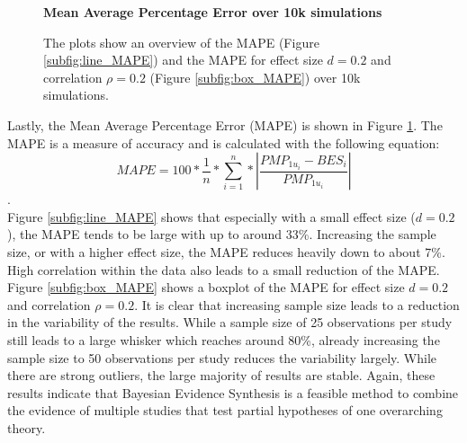 \documentclass[12pt]{article}
\begin{document}
\begin{figure}[htbp]
    \centering
    \textbf{Mean Average Percentage Error over 10k simulations} 
    \vspace{0.5em}
    \hfill
    \caption{The plots show an overview of the MAPE (Figure \ref{subfig:line_MAPE}) and the MAPE for effect size $d = 0.2$ and correlation $\rho = 0.2$ (Figure \ref{subfig:box_MAPE}) over 10k simulations.}
    \label{fig:MAPE}
\end{figure}
Lastly, the Mean Average Percentage Error (MAPE) is shown in Figure \ref{fig:MAPE}. The MAPE is a measure of accuracy and is calculated with the following equation:
\begin{equation}
    MAPE = 100*\frac{1}{n}*\sum_{i=1}^{n}*\left| \frac{PMP_{1u_i} - BES_i}{PMP_{1u_i}} \right|
\end{equation}
\citep{kim_new_2016}. \\
Figure \ref{subfig:line_MAPE} shows that especially with a small effect size ($d = 0.2$), the MAPE tends to be large with up to around 33\%. Increasing the sample size, or with a higher effect size, the MAPE reduces heavily down to about 7\%. High correlation within the data also leads to a small reduction of the MAPE. Figure \ref{subfig:box_MAPE} shows a boxplot of the MAPE for effect size $d = 0.2$ and correlation $\rho = 0.2$. It is clear that increasing sample size leads to a reduction in the variability of the results. While a sample size of 25 observations per study still leads to a large whisker which reaches around 80\%, already increasing the sample size to 50 observations per study reduces the variability largely. While there are strong outliers, the large majority of results are stable. Again, these results indicate that Bayesian Evidence Synthesis is a feasible method to combine the evidence of multiple studies that test partial hypotheses of one overarching theory.
\end{document}
